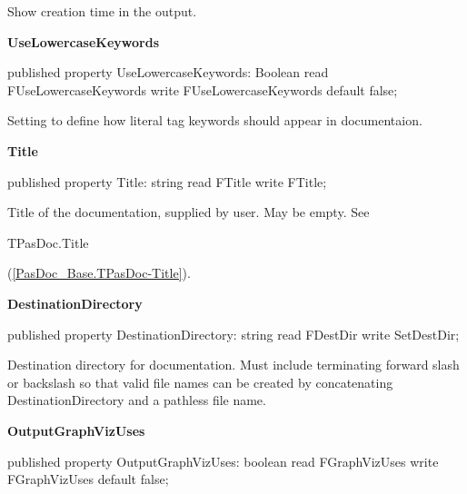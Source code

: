 \documentclass{report}
\newif\ifpdf
\begin{document}
\begin{list}{}
\begin{flushleft}
\ifpdf
\end{flushleft}
\fi


\par Show creation time in the output.\label{PasDoc_Gen.TDocGenerator-UseLowercaseKeywords}
\item[\textbf{UseLowercaseKeywords}\hfill]
\ifpdf
\begin{flushleft}
\fi
\begin{ttfamily}
published property UseLowercaseKeywords: Boolean
      read FUseLowercaseKeywords write FUseLowercaseKeywords default false;\end{ttfamily}

\ifpdf
\end{flushleft}
\fi


\par Setting to define how literal tag keywords should appear in documentaion.\label{PasDoc_Gen.TDocGenerator-Title}
\item[\textbf{Title}\hfill]
\ifpdf
\begin{flushleft}
\fi
\begin{ttfamily}
published property Title: string read FTitle write FTitle;\end{ttfamily}

\ifpdf
\end{flushleft}
\fi


\par Title of the documentation, supplied by user. May be empty. See \begin{ttfamily}TPasDoc.Title\end{ttfamily}(\ref{PasDoc_Base.TPasDoc-Title}).\label{PasDoc_Gen.TDocGenerator-DestinationDirectory}
\item[\textbf{DestinationDirectory}\hfill]
\ifpdf
\begin{flushleft}
\fi
\begin{ttfamily}
published property DestinationDirectory: string read FDestDir write SetDestDir;\end{ttfamily}

\ifpdf
\end{flushleft}
\fi


\par Destination directory for documentation. Must include terminating forward slash or backslash so that valid file names can be created by concatenating DestinationDirectory and a pathless file name.\label{PasDoc_Gen.TDocGenerator-OutputGraphVizUses}
\item[\textbf{OutputGraphVizUses}\hfill]
\ifpdf
\begin{flushleft}
\fi
\begin{ttfamily}
published property OutputGraphVizUses: boolean read FGraphVizUses write FGraphVizUses
      default false;\end{ttfamily}


\end{flushleft}
\end{list}
\end{document}
